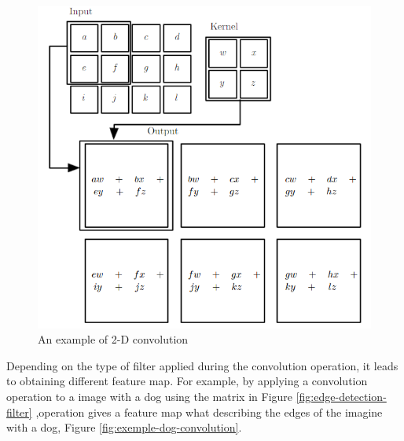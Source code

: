  \begin{figure}[htbp]
  \centerline{\includegraphics[scale=0.45]{fig/convolution+op.PNG}}  
  \caption{An example of 2-D convolution \cite{Mallat:2008:WTS:1525499}}
  \label{fig:exemple-2d-convolution}
\end{figure}

Depending on the type of filter applied during the convolution operation, it leads to obtaining different feature map.
For example, by applying a convolution operation to  a image with a dog  using the matrix 
in Figure \ref{fig:edge-detection-filter} ,operation gives a feature map what describing the edges of the 
imagine with a dog, Figure \ref{fig:exemple-dog-convolution}.

